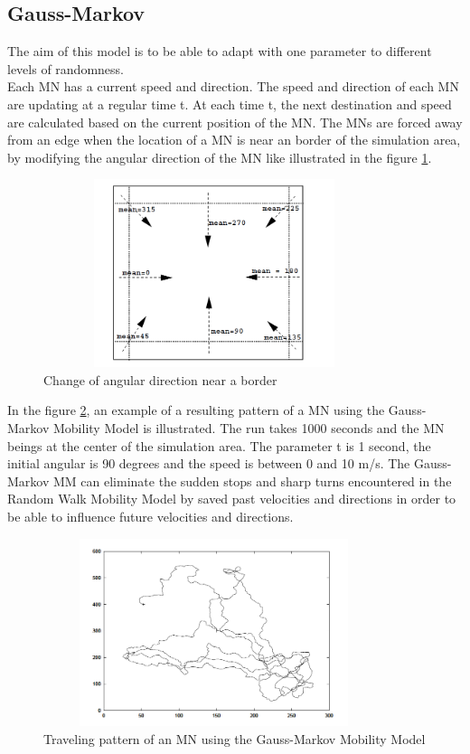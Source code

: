 \newpage

\subsection{Gauss-Markov}

The aim of this model is to be able to adapt with one parameter to different levels of randomness.\\
Each MN has a current speed and direction. The speed and direction of each MN are updating at a regular time t. At each time t, the next destination and speed are calculated based on the current position of the MN. The MNs are forced away from an edge when the location of a MN is near an border of the simulation area, by modifying the angular direction of the MN like illustrated in the figure \ref{Gauss-MarkovFig1}.\\

\begin{figure}[h]
\center
\includegraphics[width=10cm,height=55mm]{../images/gauss-markovmodel1.png}
\caption{\label{Gauss-MarkovFig1} Change of angular direction near a border}
\end{figure}

In the figure \ref{Gauss-MarkovFig2}, an example of a resulting pattern of a MN using the Gauss-Markov Mobility Model is illustrated. The run takes 1000 seconds and the MN beings at the center of the simulation area. The parameter t is 1 second, the initial angular is 90 degrees and the speed is between 0 and 10 m/s. The Gauss-Markov MM can eliminate the sudden stops and sharp turns encountered in the Random Walk Mobility Model by saved past velocities and directions in order to be able to influence future velocities and directions.\\

\begin{figure}[h]
\center
\includegraphics[width=10cm,height=55mm]{../images/gauss-markovmodel2.png}
\caption{\label{Gauss-MarkovFig2} Traveling pattern of an MN using the Gauss-Markov Mobility Model}
\end{figure}

